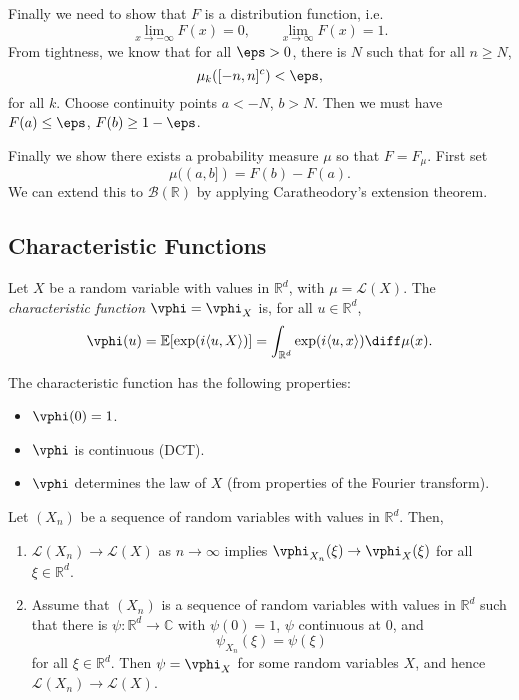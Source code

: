 \documentclass[12pt]{article}
\begin{document}
\begin{proofbox}
	Finally we need to show that $F$ is a distribution function, i.e.
	\[
	\lim_{x \to -\infty} F(x) = 0, \qquad \lim_{x \to \infty} F(x)= 1.
	\]
	From tightness, we know that for all $\eps > 0$, there is $N$ such that for all $n \geq N$,
	\[
		\mu_k([-n, n]^{c}) < \eps,
	\]
	for all $k$. Choose continuity points $a < -N$, $b > N$. Then we must have $F(a) \leq \eps$, $F(b) \geq 1 - \eps$.

	Finally we show there exists a probability measure $\mu$ so that $F = F_\mu$. First set
	\[
		\mu((a, b]) = F(b) - F(a).
	\]
	We can extend this to $\mathcal{B}(\mathbb{R})$ by applying Caratheodory's extension theorem.
\end{proofbox}

\subsection{Characteristic Functions}%
\label{sub:cf}

\begin{definition}
	Let $X$ be a random variable with values in $\mathbb{R}^d$, with $\mu = \mathcal{L}(X)$. The \emph{characteristic function} $\vphi = \vphi_X$ is, for all $u \in \mathbb{R}^d$,
	\[
	\vphi(u) = \mathbb{E}[\exp(i \langle u, X \rangle)] = \int_{\mathbb{R}^d} \exp(i \langle u, x \rangle) \diff \mu (x).
	\]
\end{definition}

The characteristic function has the following properties:
\begin{itemize}
	\item $\vphi(0) = 1$.
	\item $\vphi$ is continuous (DCT).
	\item $\vphi$ determines the law of $X$ (from properties of the Fourier transform).
\end{itemize}

\begin{theorem}[Levy]
	Let $(X_n)$ be a sequence of random variables with values in $\mathbb{R}^d$. Then,
	\begin{enumerate}[\normalfont(i)]
		\item $\mathcal{L}(X_n) \to \mathcal{L}(X)$ as $n \to \infty$ implies $\vphi_{X_n}(\xi) \to \vphi_X(\xi)$ for all $\xi \in \mathbb{R}^d$.
		\item Assume that $(X_n)$ is a sequence of random variables with values in $\mathbb{R}^d$ such that there is $\psi : \mathbb{R}^d \to \mathbb{C}$ with $\psi(0) = 1$, $\psi$ continuous at $0$, and
			\[
			\psi_{X_n}(\xi) = \psi(\xi)
			\]
			 for all $\xi \in \mathbb{R}^d$. Then $\psi = \vphi_X$ for some random variables $X$, and hence $\mathcal{L}(X_n) \to \mathcal{L}(X)$.
	\end{enumerate}
\end{theorem}
\end{document}
